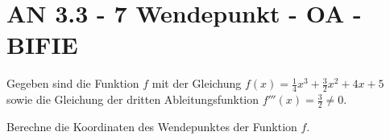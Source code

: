 \section{AN 3.3 - 7 Wendepunkt - OA - BIFIE}

\begin{beispiel}[AN 3.3]{1} %
	Gegeben sind die Funktion $f$ mit der Gleichung \mbox{$f(x)=\frac{1}{4}x^3+\frac{3}{2}x^2+4x+5$} sowie die Gleichung der dritten Ableitungsfunktion $f'''(x)=\frac{3}{2}\neq 0$.
	
	\leer
	
Berechne die Koordinaten des Wendepunktes der Funktion $f$.	



\end{beispiel}